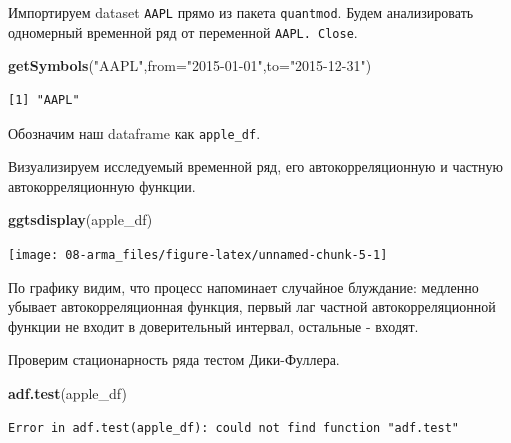 \documentclass[]{book}
\newenvironment{Shaded}{\begin{snugshade}}{\end{snugshade}}
\newcommand{\DataTypeTok}[1]{\textcolor[rgb]{0.13,0.29,0.53}{#1}}
\newcommand{\KeywordTok}[1]{\textcolor[rgb]{0.13,0.29,0.53}{\textbf{#1}}}
\newcommand{\NormalTok}[1]{#1}
\newcommand{\OperatorTok}[1]{\textcolor[rgb]{0.81,0.36,0.00}{\textbf{#1}}}
\newcommand{\StringTok}[1]{\textcolor[rgb]{0.31,0.60,0.02}{#1}}
\begin{document}
Импортируем dataset \texttt{AAPL} прямо из пакета \texttt{quantmod}. Будем анализировать одномерный временной ряд от переменной \texttt{AAPL.\ Close}.

\begin{Shaded}
\begin{Highlighting}[]
\KeywordTok{getSymbols}\NormalTok{(}\StringTok{"AAPL"}\NormalTok{,}\DataTypeTok{from=}\StringTok{"2015-01-01"}\NormalTok{,}\DataTypeTok{to=}\StringTok{"2015-12-31"}\NormalTok{)}
\end{Highlighting}
\end{Shaded}

\begin{verbatim}
[1] "AAPL"
\end{verbatim}

Обозначим наш dataframe как \texttt{apple\_df}.

\begin{Shaded}
\end{Shaded}

Визуализируем исследуемый временной ряд, его автокорреляционную и частную автокорреляционную функции.

\begin{Shaded}
\begin{Highlighting}[]
\KeywordTok{ggtsdisplay}\NormalTok{(apple_df)}
\end{Highlighting}
\end{Shaded}

\begin{center}\texttt{[image: 08-arma\_files/figure-latex/unnamed-chunk-5-1]} \end{center}

По графику видим, что процесс напоминает случайное блуждание: медленно убывает автокорреляционная функция, первый лаг частной автокорреляционной функции не входит в доверительный интервал, остальные - входят.

Проверим стационарность ряда тестом Дики-Фуллера.

\begin{Shaded}
\begin{Highlighting}[]
\KeywordTok{adf.test}\NormalTok{(apple_df)}
\end{Highlighting}
\end{Shaded}

\begin{verbatim}
Error in adf.test(apple_df): could not find function "adf.test"
\end{verbatim}
\end{document}
